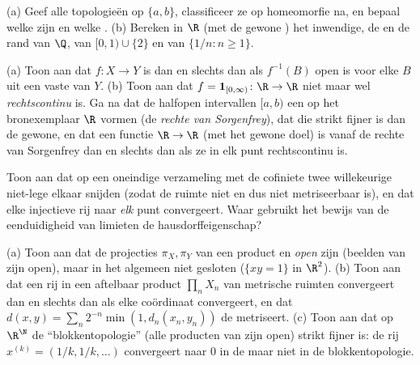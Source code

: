 \begin{exercise}[$\star$]\label{exo:b3:topology:1}
(a) Geef alle topologieën op $\{a, b\}$, classificeer ze op
homeomorfie na, en bepaal welke  zijn en welke
.
(b) Bereken in $\R$ (met de gewone ) het inwendige, de
 en de rand van $\Q$, van $[0,1) \cup \{2\}$ en van
$\{1/n : n \geq 1\}$.
\end{exercise}

\begin{exercise}[$\star$]\label{exo:b3:topology:2}
(a) Toon aan dat $f\colon X \to Y$  is dan en slechts dan
als $f^{-1}(B)$ open is voor elke $B$ uit een vaste  van
$Y$.
(b) Toon aan dat $f = \mathbf 1_{[0,\infty)} \colon \R \to \R$
niet  maar wel \emph{rechtscontinu} is. Ga na dat de
halfopen intervallen $[a, b)$ een  op het
bronexemplaar $\R$ vormen (de \emph{rechte van Sorgenfrey}), dat
die  strikt fijner is dan de gewone, en dat een functie
$\R \to \R$ (met het gewone doel)  is vanaf de rechte van
Sorgenfrey dan en slechts dan als ze in elk punt rechtscontinu is.
\end{exercise}

\begin{exercise}[$\star$]\label{exo:b3:topology:3}
Toon aan dat op een oneindige verzameling met de cofiniete
 twee willekeurige niet-lege  elkaar
snijden (zodat de ruimte niet  en dus niet metriseerbaar
is), en dat elke injectieve rij naar \emph{elk} punt convergeert.
Waar gebruikt het bewijs van de eenduidigheid van limieten de
hausdorffeigenschap?
\end{exercise}

\begin{exercise}[$\star\star$]\label{exo:b3:topology:4}
(a) Toon aan dat de projecties $\pi_X, \pi_Y$ van een product
 en \emph{open} zijn (beelden van  zijn
open), maar in het algemeen niet gesloten ($\{xy = 1\}$ in
$\R^2$).
(b) Toon aan dat een rij in een aftelbaar product $\prod_n X_n$
van metrische ruimten convergeert dan en slechts dan als elke
coördinaat convergeert, en dat $d(x, y) = \sum_n
2^{-n}\min(1, d_n(x_n, y_n))$ de  metriseert.
(c) Toon aan dat op $\R^\N$ de ``blokkentopologie'' (alle
producten van  zijn open) strikt fijner is: de
rij $x^{(k)} = (1/k, 1/k, \dots)$ convergeert naar $0$ in de
 maar niet in de blokkentopologie.
\end{exercise}

